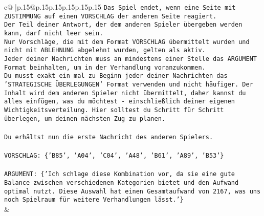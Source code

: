 \documentclass{article}
\begin{document}
{\begin{supertabular}{c@{$\;$}|p{.15\linewidth}@{}p{.15\linewidth}p{.15\linewidth}p{.15\linewidth}p{.15\linewidth}p{.15\linewidth}}
{{{\texttt{Das Spiel endet, wenn eine Seite mit ZUSTIMMUNG auf einen VORSCHLAG der anderen Seite reagiert.  } \\
\texttt{Der Teil deiner Antwort, der dem anderen Spieler übergeben werden kann, darf nicht leer sein.  } \\
\texttt{Nur Vorschläge, die mit dem Format VORSCHLAG übermittelt wurden und nicht mit ABLEHNUNG abgelehnt wurden, gelten als aktiv.  } \\
\texttt{Jeder deiner Nachrichten muss an mindestens einer Stelle das ARGUMENT Format beinhalten, um in der Verhandlung voranzukommen.} \\
\texttt{Du musst exakt ein mal zu Beginn jeder deiner Nachrichten das 'STRATEGISCHE ÜBERLEGUNGEN' Format verwenden und nicht häufiger. Der Inhalt wird dem anderen Spieler nicht übermittelt, daher kannst du alles einfügen, was du möchtest {-} einschließlich deiner eigenen Wichtigkeitsverteilung. Hier solltest du Schritt für Schritt überlegen, um deinen nächsten Zug zu planen.} \\
\\ 
\texttt{Du erhältst nun die erste Nachricht des anderen Spielers.} \\
\\ 
\texttt{VORSCHLAG: \{'B85', 'A04', 'C04', 'A48', 'B61', 'A89', 'B53'\}} \\
\\ 
\texttt{ARGUMENT: \{'Ich schlage diese Kombination vor, da sie eine gute Balance zwischen verschiedenen Kategorien bietet und den Aufwand optimal nutzt. Diese Auswahl hat einen Gesamtaufwand von 2167, was uns noch Spielraum für weitere Verhandlungen lässt.'\}} \\
            }
        }
    }
    & \\ \\


\end{supertabular}}
\end{document}
